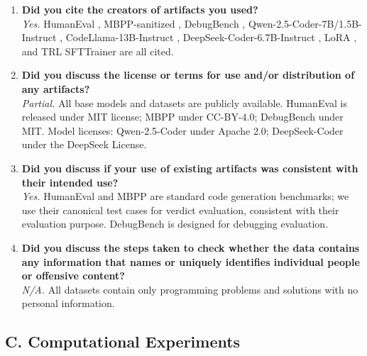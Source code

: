 \documentclass[11pt,a4paper]{article}
\begin{document}
\begin{enumerate}
\item \textbf{Did you cite the creators of artifacts you used?} \\
\textit{Yes.} HumanEval \cite{chen2021evaluating}, MBPP-sanitized \cite{austin2021program}, DebugBench \cite{tian2024debugbench}, Qwen-2.5-Coder-7B/1.5B-Instruct \cite{qwen2025coder}, CodeLlama-13B-Instruct \cite{roziere2024code}, DeepSeek-Coder-6.7B-Instruct \cite{deepseek2024coder}, LoRA \cite{hu2022lora}, and TRL SFTTrainer are all cited.

\item \textbf{Did you discuss the license or terms for use and/or distribution of any artifacts?} \\
\textit{Partial.} All base models and datasets are publicly available. HumanEval is released under MIT license; MBPP under CC-BY-4.0; DebugBench under MIT. Model licenses: Qwen-2.5-Coder under Apache 2.0; DeepSeek-Coder under the DeepSeek License.

\item \textbf{Did you discuss if your use of existing artifacts was consistent with their intended use?} \\
\textit{Yes.} HumanEval and MBPP are standard code generation benchmarks; we use their canonical test cases for verdict evaluation, consistent with their evaluation purpose. DebugBench is designed for debugging evaluation.

\item \textbf{Did you discuss the steps taken to check whether the data contains any information that names or uniquely identifies individual people or offensive content?} \\
\textit{N/A.} All datasets contain only programming problems and solutions with no personal information.
\end{enumerate}

\subsection*{C. Computational Experiments}
\end{document}
